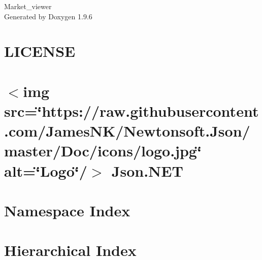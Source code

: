 \documentclass[twoside]{book}
\newcommand{\+}{\discretionary{\mbox{\scriptsize$\hookleftarrow$}}{}{}}
\newcommand{\clearemptydoublepage}{%
    \newpage{\pagestyle{empty}\cleardoublepage}%
  }
\begin{document}
  \raggedbottom
    \hypersetup{pageanchor=false,
                bookmarksnumbered=true,
                pdfencoding=unicode
               }
  \begin{titlepage}
  \vspace*{7cm}
  \begin{center}%
  {\Large Market\+\_\+viewer}\\
  \vspace*{1cm}
  {\large Generated by Doxygen 1.9.6}\\
  \end{center}
  \end{titlepage}
  \clearemptydoublepage
  \tableofcontents
  \clearemptydoublepage
  \hypersetup{pageanchor=true}
\chapter{LICENSE}
\label{md__c___users_kuba___desktop_market_viewer__market_viewer_packages__newtonsoft__json_13_0_3__l_i_c_e_n_s_e}

\chapter{\texorpdfstring{$<$}{<}img src=\char`\"{}https\+://raw.\+githubusercontent.\+com/\+James\+NK/\+Newtonsoft.\+Json/master/\+Doc/icons/logo.\+jpg\char`\"{} alt=\char`\"{}\+Logo\char`\"{}/\texorpdfstring{$>$}{>} Json.\+NET}
\label{md__c___users_kuba___desktop_market_viewer__market_viewer_packages__newtonsoft__json_13_0_3__r_e_a_d_m_e}

\chapter{Namespace Index}

\chapter{Hierarchical Index}

\end{document}
